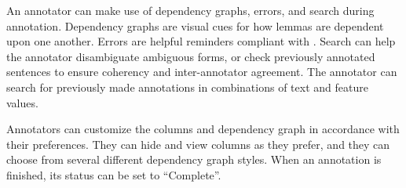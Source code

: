 An annotator can make use of dependency graphs, errors, and search during annotation.
Dependency graphs are visual cues for how lemmas are dependent upon one another.
Errors are helpful reminders compliant with \ud.
Search can help the annotator disambiguate ambiguous forms, or check previously annotated sentences to ensure coherency and inter-annotator agreement.
The annotator can search for previously made annotations in combinations of text and feature values.

Annotators can customize the columns and dependency graph in accordance with their preferences.
They can hide and view columns as they prefer, and they can choose from several different dependency graph styles.
When an annotation is finished, its status can be set to ``Complete''.
